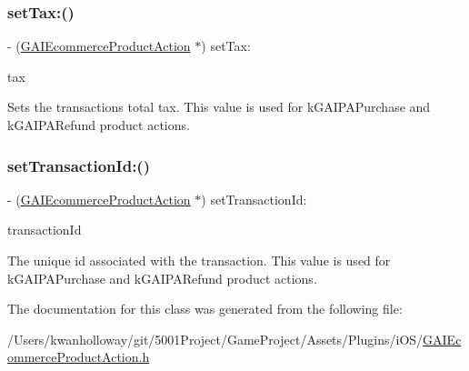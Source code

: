 \subsubsection{\texorpdfstring{set\+Tax\+:()}{setTax:()}}
{\footnotesize\ttfamily -\/ (\hyperlink{interface_g_a_i_ecommerce_product_action}{G\+A\+I\+Ecommerce\+Product\+Action} $\ast$) set\+Tax\+: \begin{DoxyParamCaption}\item[{(N\+S\+Number $\ast$)}]{tax }\end{DoxyParamCaption}}

Sets the transaction\textquotesingle{}s total tax. This value is used for k\+G\+A\+I\+P\+A\+Purchase and k\+G\+A\+I\+P\+A\+Refund product actions. \mbox{\label{interface_g_a_i_ecommerce_product_action_a94b1cacc99d153cbe04a92cfee5618d7}} 
\subsubsection{\texorpdfstring{set\+Transaction\+Id\+:()}{setTransactionId:()}}
{\footnotesize\ttfamily -\/ (\hyperlink{interface_g_a_i_ecommerce_product_action}{G\+A\+I\+Ecommerce\+Product\+Action} $\ast$) set\+Transaction\+Id\+: \begin{DoxyParamCaption}\item[{(N\+S\+String $\ast$)}]{transaction\+Id }\end{DoxyParamCaption}}

The unique id associated with the transaction. This value is used for k\+G\+A\+I\+P\+A\+Purchase and k\+G\+A\+I\+P\+A\+Refund product actions. 

The documentation for this class was generated from the following file\+:\begin{DoxyCompactItemize}
\item 
/\+Users/kwanholloway/git/5001\+Project/\+Game\+Project/\+Assets/\+Plugins/i\+O\+S/\hyperlink{_g_a_i_ecommerce_product_action_8h}{G\+A\+I\+Ecommerce\+Product\+Action.\+h}\end{DoxyCompactItemize}
